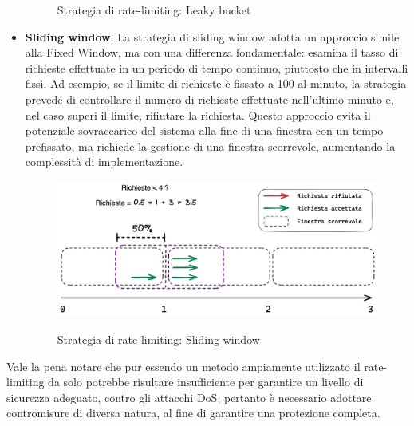 \begin{itemize}
\begin{figure}[h]
        \label{fig:laky-bucket}
        \captionsetup{justification=centering}
        \caption{Strategia di rate-limiting: Leaky bucket}
    \end{figure}
    \item \textbf{Sliding window}: La strategia di sliding window adotta un approccio simile alla Fixed Window, ma con una differenza
    fondamentale: esamina il tasso di richieste effettuate in un periodo di tempo continuo, piuttosto che in intervalli
    fissi. Ad esempio, se il limite di richieste è fissato a 100 al minuto, la strategia prevede di controllare il numero di
    richieste effettuate nell'ultimo minuto e, nel caso superi il limite, rifiutare la richiesta. Questo approccio evita il
    potenziale sovraccarico del sistema alla fine di una finestra con un tempo prefissato, ma richiede la gestione di una
    finestra scorrevole, aumentando la complessità di implementazione.
    \begin{figure}[h]
        \centering
        \includegraphics[width=13cm]{./chapters/1.state-of-art/images/4.sliding_window.png}
        \label{fig:sliding-window}
        \captionsetup{justification=centering}
        \caption{Strategia di rate-limiting: Sliding window}
    \end{figure}
\end{itemize}

Vale la pena notare che pur essendo un metodo ampiamente utilizzato il rate-limiting da solo potrebbe risultare
insufficiente per garantire un livello di sicurezza adeguato, contro gli attacchi DoS, pertanto è necessario adottare
contromisure di diversa natura, al fine di garantire una protezione completa.